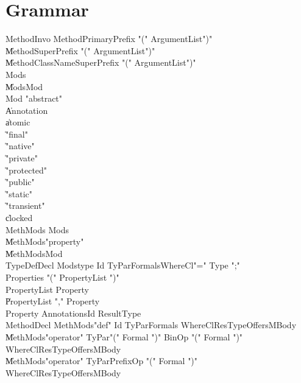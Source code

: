 \chapter{Grammar}


{\small


\begin{grammar}

 MethodInvo  \: MethodPrimaryPrefix \xcd"(" ArgumentList\opt \xcd")"\\
    \| MethodSuperPrefix \xcd"(" ArgumentList\opt \xcd")"\\
    \| MethodClassNameSuperPrefix \xcd"(" ArgumentList\opt \xcd")"\\
 Mods\opt  \: \\
    \| Mods\opt Mod\\
 Mod  \: \xcd"abstract"\\
    \| Annotation\\
    \| atomic\\
    \| \xcd"final"\\
    \| \xcd"native"\\
    \| \xcd"private"\\
    \| \xcd"protected"\\
    \| \xcd"public"\\
    \| \xcd"static"\\
    \| \xcd"transient"\\
    \| clocked\\
 MethMods\opt  \: Mods\opt\\
    \| MethMods\opt \xcd"property" \\
    \| MethMods\opt Mod\\
 TypeDefDecl  \: Mods\opt type Id TyPar\opt Formals\opt WhereCl\opt \xcd"=" Type \xcd";"\\
 Properties  \: \xcd"(" PropertyList \xcd")"\\
 PropertyList  \: Property\\
    \| PropertyList \xcd"," Property\\
 Property  \: Annotations\opt Id ResultType\\
 MethodDecl  \: MethMods\opt \xcd"def" Id TyPar\opt Formals WhereCl\opt ResType\opt Offers\opt MBody\\
    \| MethMods\opt \xcd"operator" TyPar\opt \xcd"(" Formal  \xcd")" BinOp \xcd"(" Formal  \xcd")" WhereCl\opt ResType\opt Offers\opt MBody\\
    \| MethMods\opt \xcd"operator" TyPar\opt PrefixOp \xcd"(" Formal  \xcd")" WhereCl\opt ResType\opt Offers\opt MBody\\

\end{grammar}}
